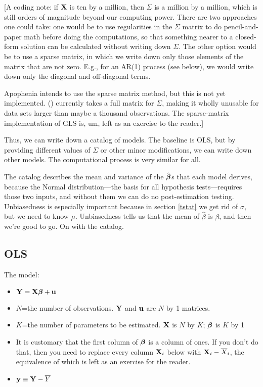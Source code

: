[A coding note: if ${\bf X}$ is ten by a million, then $\Sigma$ is a million
by a million, which is still orders of magnitude beyond our computing
power. There are two approaches one could take: one would be to use
regularities in the $\Sigma$ matrix to do pencil-and-paper math before
doing the computations, so that something nearer to a closed-form
solution can be calculated without writing down $\Sigma$. The other
option would be to use a sparse matrix, in which
we write down only those elements of the matrix that are not zero. E.g.,
for an AR(1) process (see below), we would write down only the diagonal and
off-diagonal terms.

Apophenia intends to use the sparse matrix method, but this is not yet
implemented. () currently takes a full matrix
for $\Sigma$, making it wholly unusable for data sets larger than maybe a
thousand observations. The sparse-matrix implementation of GLS is, um,
left as an exercise to the reader.]

Thus, we can write down a catalog of models. The baseline is OLS, but by
providing different values of $\Sigma$ or other minor modifications, we
can write down other models. The computational process is very similar
for all.

The catalog describes the mean and variance of the $\hat{{\mbox{\boldmath$\beta$}}}$s that
each model derives, because the Normal distribution---the basis for all
hypothesis tests---requires those two inputs,
and without them we can do no post-estimation testing. Unbiasedness is especially
important because in section \ref{tstat} we get rid of $\sigma$, but we
need to know $\mu$. Unbiasedness tells us that the mean of $\hat\beta$
is $\beta$, and then we're good to go. On with the catalog.

\subsection{OLS}
The model: 
\begin{itemize}
\item ${\bf Y}={\bf X}{\mbox{\boldmath$\beta$}} + {\bf u}$
\item $N$=the number of observations. ${\bf Y}$ and ${\bf u}$ are $N$ by 1
matrices.
\item $K$=the number of parameters to be estimated. ${\bf X}$ is $N$ by $K$;
${\mbox{\boldmath$\beta$}}$ is $K$ by 1
\item It is customary that the first column of ${\mbox{\boldmath$\beta$}}$ is a column of
ones. If you don't do that, then you need to replace every column ${\bf X}_i$ below
with ${\bf X}_i-\overline X_i$, the equivalence of which is left as an exercise
for the reader.
\item ${\bf y}\equiv {\bf Y} - \overline Y$
\end{itemize}


